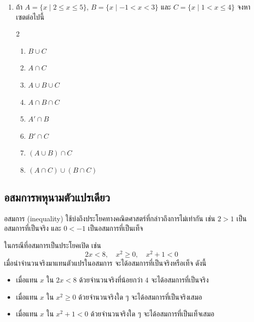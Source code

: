 \begin{enumerate}[label=\arabic*., leftmargin=*]
\begin{multicols}{2}
\begin{enumerate}[label=\theenumi\arabic*), leftmargin=*]
		\item $A \cap B$
		\item $A \cup B$
		\item $A - B$
		\item $A \cap C$
		\item $A \cup C$
		\item $A - C$
		\item $A \cap D$
		\item $A \cup D$
		\item $A - D$
		\item $B \cap C$
		\item $B \cup C$
		\item $B - C$
	\end{enumerate}
\end{multicols}
	\item ถ้า $A = \{x \mid 2 \le x \le 5\}$, $B = \{x \mid -1 < x < 3\}$ และ $C = \{x \mid 1 < x \le 4\}$ จงหาเซตต่อไปนี้
		\begin{multicols}{2}
	\begin{enumerate}[label=\theenumi\arabic*), leftmargin=*]
	\item $B \cup C$
	\item $A \cap C$
	\item $A \cup B \cup C$
	\item $A \cap B \cap C$
	\item $A' \cap B$
	\item $B' \cap C$
	\item $(A \cup B) \cap C$
	\item $(A \cap C) \cup (B \cap C)$
\end{enumerate}
	\end{multicols}
\end{enumerate}
\newpage
\subsection*{อสมการพหุนามตัวแปรเดียว}

อสมการ (inequality) ใช้บ่งถึงประโยคทางคณิตศาสตร์ที่กล่าวถึงการไม่เท่ากัน เช่น $2 > 1$ เป็นอสมการที่เป็นจริง และ $0 < -1$ เป็นอสมการที่เป็นเท็จ 

ในกรณีที่อสมการเป็นประโยคเปิด เช่น 
$$2x < 8, \quad x^2 \geq 0, \quad x^2 + 1 < 0$$
เมื่อนำจำนวนจริงมาแทนตัวแปรในอสมการ จะได้อสมการที่เป็นจริงหรือเท็จ ดังนี้

\vspace{0.5em}
\begin{itemize}[label=\quad, leftmargin=1em, itemsep=0.4em]
	\item เมื่อแทน $x$ ใน $2x < 8$ ด้วยจำนวนจริงที่น้อยกว่า $4$ จะได้อสมการที่เป็นจริง
	\item เมื่อแทน $x$ ใน $x^2 \geq 0$ ด้วยจำนวนจริงใด ๆ จะได้อสมการที่เป็นจริงเสมอ
	\item เมื่อแทน $x$ ใน $x^2 + 1 < 0$ ด้วยจำนวนจริงใด ๆ จะได้อสมการที่เป็นเท็จเสมอ
\end{itemize}

